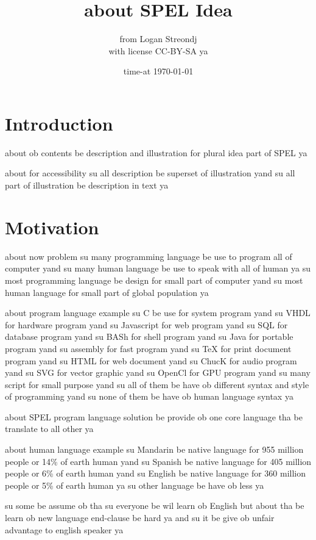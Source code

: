\documentclass[12pt]{article}
\title{about SPEL Idea}
\author{from Logan Streondj \\
with license CC-BY-SA ya}
\date{time-at \today }
\begin{document}
\maketitle
\tableofcontents
\section{Introduction}

about ob contents 
be description and illustration for plural idea part of SPEL ya

about for accessibility 
su all description be superset of illustration yand
su all part of illustration be description in text ya
\section{Motivation}
about now problem
su many programming language be use to program all of computer 
yand su many human language be use to speak 
with all of human ya
su most programming language be design for small part of
computer yand
su most human language for small part of global population ya

about program language example 
su C be use for system program yand su VHDL for hardware program
yand su Javascript for web program yand su SQL for database
program yand su BASh for shell program yand su Java for portable 
program yand su assembly for fast program yand su TeX for print 
document program yand su HTML for web document yand su ChucK for 
audio program yand su SVG for vector graphic yand su OpenCl 
for GPU program yand su many script for small purpose
yand su all of them be have ob different syntax and
style of programming yand su none of them be have ob human
language syntax ya

about SPEL program language solution
be provide ob one core language tha be translate to all other ya

about human language example
su Mandarin be native language for 955 million people or
14\% of earth human yand
su Spanish be native language for 405 million people or 6\% of
earth human yand
su English be native language for 360 million people or 5\% of
earth human ya su other language be have ob less ya

su some be assume ob tha su everyone be wil learn ob English 
but about tha be learn ob new language end-clause be hard ya and
su it be give ob unfair advantage to english speaker ya
\end{document}
